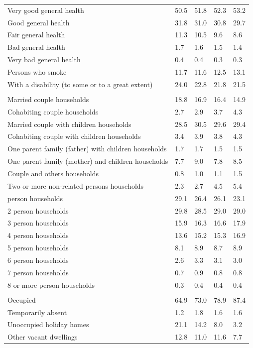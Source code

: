 \documentclass{article}
\begin{document}
\begin{table}[h]
\begin{tabular}{KTTTT}
    \hline
Very good general health & 50.5& 51.8&52.3& 53.2\\
Good general health & 31.8& 31.0& 30.8& 29.7\\
Fair general health & 11.3& 10.5& 9.6&  8.6\\
Bad general health & 1.7& 1.6&1.5& 1.4\\
Very bad general health & 0.4& 0.4&0.3& 0.3\\
    \hline
Persons who smoke & 11.7& 11.6&12.5& 13.1\\
    \hline
With a disability (to some or to a great extent) & 24.0& 22.8&21.8& 21.5\\
\hline
    \\ 
    \hline
Married couple households & 18.8& 16.9& 16.4& 14.9\\
Cohabiting couple households & 2.7& 2.9& 3.7& 4.3\\
Married couple with children households & 28.5& 30.5& 29.6& 29.4\\
Cohabiting couple with children households & 3.4& 3.9& 3.8& 4.3\\
One parent family (father) with  children households & 1.7& 1.7& 1.5& 1.5\\
One parent family (mother) and children households & 7.7& 9.0& 7.8& 8.5\\
Couple and others households  & 0.8& 1.0& 1.1& 1.5\\
Two or more non-related persons households & 2.3& 2.7& 4.5& 5.4\\
     person households & 29.1& 26.4& 26.1& 23.1\\
2 person households & 29.8& 28.5& 29.0& 29.0\\
3 person households & 15.9& 16.3& 16.6& 17.9\\
4 person households & 13.6& 15.2& 15.3& 16.9\\
5 person households & 8.1& 8.9& 8.7& 8.9\\
6 person households & 2.6& 3.3& 3.1& 3.0\\
7 person households & 0.7& 0.9& 0.8& 0.8\\
8 or more person households & 0.3& 0.4& 0.4& 0.4\\
\hline
    \\ 
    \hline
Occupied & 64.9& 73.0& 78.9& 87.4\\
Temporarily absent & 1.2& 1.8& 1.6& 1.6\\
Unoccupied holiday homes & 21.1& 14.2&  8.0&  3.2\\
Other vacant dwellings & 12.8& 11.0& 11.6&  7.7\\
\hline
\end{tabular}
\end{table}
\end{document}
